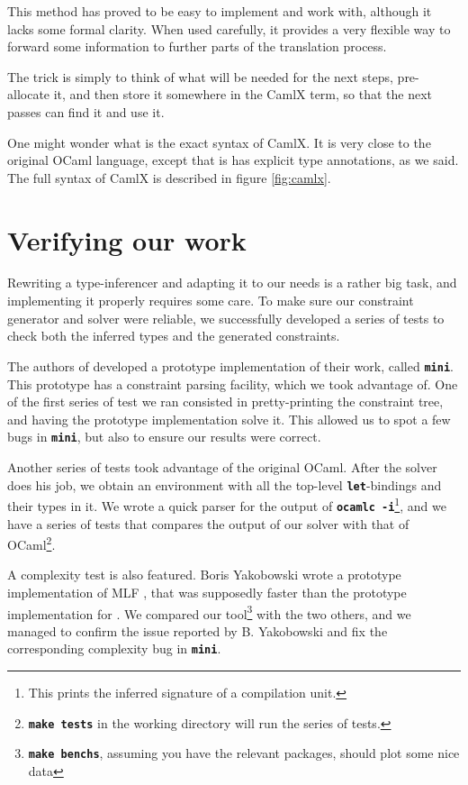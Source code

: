 \documentclass[10pt,a4paper,twoside,titlepage,twocolumn]{article}
\newcommand{\code}[1]{\textbf{\texttt{#1}}}
\begin{document}
This method has proved to be easy to implement and work with, although it lacks
some formal clarity. When used carefully, it provides a very flexible way to
forward some information to further parts of the translation process.

The trick is simply to think of what will be needed for the next steps,
pre-allocate it, and then store it somewhere in the CamlX term, so
that the next passes can find it and use it.

One might wonder what is the exact syntax of CamlX. It is very close to the
original OCaml language, except that is has explicit type annotations, as we
said. The full syntax of CamlX is described in figure \vref{fig:camlx}.


\section{Verifying our work}

Rewriting a type-inferencer and adapting it to our needs is a rather big task, and
implementing it properly requires some care. To make sure our constraint
generator and solver were reliable, we successfully developed a series of tests
to check both the inferred types and the generated constraints.

The authors of \cite{pottier2005essence} developed a prototype implementation of
their work, called \code{mini}. This prototype has a constraint parsing
facility, which we took advantage of. One of the first series of test we ran
consisted in pretty-printing the constraint tree, and having the prototype
implementation solve it. This allowed us to spot a few bugs in \code{mini}, but
also to ensure our results were correct.

Another series of tests took advantage of the original OCaml. After the solver
does his job, we obtain an environment with all the top-level
\code{let}-bindings and their types in it. We wrote a quick parser for the
output of \code{ocamlc -i}\footnote{This prints the inferred signature of a
compilation unit.}, and we have a series of tests that compares the output of
our solver with that of OCaml\footnote{\code{make tests} in the working
directory will run the series of tests.}.

A complexity test is also featured. Boris Yakobowski wrote a prototype
implementation of MLF \cite{boris2008}, that was supposedly faster than the
prototype implementation for \cite{pottier2005essence}. We compared our
tool\footnote{\code{make benchs}, assuming you have the relevant packages,
should plot some nice data} with the two others, and we managed to confirm the
issue reported by B. Yakobowski and fix the corresponding complexity bug in
\code{mini}.
\end{document}

